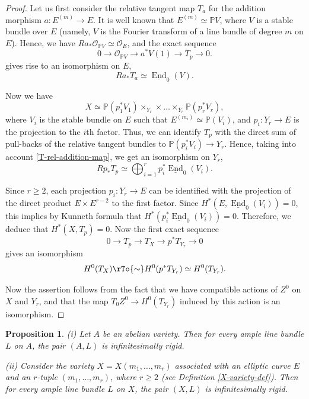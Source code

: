 \documentclass[reqno]{amsart}
\newtheorem{prop}[theorem]{Proposition}
\theoremstyle{definition}
\theoremstyle{remark}
\renewcommand{\P}{{\mathbb P}}
\newcommand{\ot}{\otimes}
\newcommand{\und}{\underline}
\newcommand{\OO}{{\mathcal O}}
\newcommand{\End}{\operatorname{End}}
\numberwithin{equation}{section}
\begin{document}
\begin{proof}
Let us first consider the relative tangent map $T_a$ for the addition morphism $a:E^{(m)}\to E$. It is well known that $E^{(m)}\simeq \P V$,
where $V$ is a stable bundle over $E$ (namely, $V$ is the Fourier transform of a line bundle of degree $m$ on $E$).
Hence, we have $Ra_*\OO_{\P V}\simeq \OO_E$,
and the exact sequence
$$0\to \OO_{\P V}\to a^*V(1)\to T_p\to 0.$$
gives rise to an isomorphism on $E$,
\begin{equation}\label{T-rel-addition-map}
Ra_*T_a\simeq \und{\End}_0(V).
\end{equation}

Now we have
$$X\simeq \P(p_1^*V_1)\times_{Y_r}\times\ldots \times_{Y_r} \P(p_r^*V_r),$$
where $V_i$ is the stable bundle on $E$ such that $E^{(m_i)}\simeq \P(V_i)$, and $p_i:Y_r\to E$ is the projection to
the $i$th factor. Thus, we can identify $T_p$ with the direct sum of pull-backs of the relative tangent bundles to
$\P(p_i^*V_i)\to Y_r$. Hence, taking into account \eqref{T-rel-addition-map}, we get an isomorphism on $Y_r$,
$$Rp_*T_p\simeq \bigoplus_{i=1}^r p_i^*\und{\End}_0(V_i).$$

Since $r\ge 2$, each projection $p_i:Y_r\to E$ can be identified with the projection of the direct product $E\times E^{r-2}$ to the first factor.
Since $H^*(E,\und{\End}_0(V_i))=0$, this implies by Kunneth formula that $H^*(p_i^*\und{\End}_0(V_i))=0$.
Therefore, we deduce that $H^*(X,T_p)=0$.
Now the first exact sequence 
$$0\to T_p\to T_X\to p^*T_{Y_r}\to 0$$
gives an isomorphism 
$$H^0(T_X)\rTo{\sim} H^0(p^*T_{Y_r})\simeq H^0(T_{Y_r}).$$

Now the assertion follows from the fact that we have compatible actions of $Z^0$ on $X$ and $Y_r$,
and that the map $T_0Z^0\to H^0(T_{Y_r})$ induced by this action is an isomorphism.
\end{proof}

\begin{prop}\label{ab-sym-inf-rigid-prop} 
(i) Let $A$ be an abelian variety. Then for every ample line bundle $L$ on $A$, the pair $(A,L)$ is infinitesimally rigid.

\noindent
(ii) Consider the variety $X=X(m_1,\ldots,m_r)$ associated with an elliptic curve $E$ and an $r$-tuple $(m_1,\ldots,m_r)$, where $r\ge 2$
(see Definition \ref{X-variety-def}).
Then for every ample line bundle $L$ on $X$, the pair $(X,L)$ is infinitesimally rigid.
\end{prop}
\end{document}
